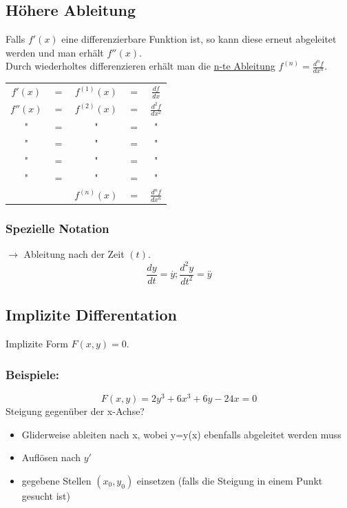 \documentclass[11pt]{amsart}
\theoremstyle{remark}
\begin{document}
\subsection{H\"ohere Ableitung}
Falls $f'(x)$ eine differenzierbare Funktion ist, so kann diese erneut abgeleitet werden und man erh\"alt $f''(x)$.\\
Durch wiederholtes differenzieren erh\"alt man die \underline{n-te Ableitung} $f^{(n)} = \frac {d^nf}{dx^n}$.
\begin{table}[h]
\begin{center}
\begin{tabular}[h]{ccccc}
$f'(x)$&$=$&$f^{(1)}(x)$&$=$&$\frac {df}{dx}$\\
$f''(x)$&$=$&$f^{(2)}(x)$&$=$&$\frac {d^2f}{dx^2}$\\
"&$=$&"&$=$&"\\
"&$=$&"&$=$&"\\
"&$=$&"&$=$&"\\
"&$=$&"&$=$&"\\
&&$f^{(n)}(x)$&$=$&$\frac {d^nf}{dx^n}$\\
\end{tabular}
\end{center}
\label{default}
\end{table}
\subsubsection*{Spezielle Notation}
$\rightarrow$ Ableitung nach der Zeit $(t)$.
\begin{equation*}
\frac {dy}{dt} = \overset {.}{y}; \frac {d^2y}{dt^2} = \overset {..}{y}
\end{equation*}

\subsection{Implizite Differentation}
Implizite Form $F(x,y)=0$.
\subsubsection*{Beispiele:}
\begin{equation*}
F(x,y)=2y^3+6x^3 +6y-24x=0
\end{equation*}
Steigung gegen\"uber der x-Achse?
\begin{itemize}
\item Gliderweise ableiten nach x, wobei y=y(x) ebenfalls abgeleitet werden muss
\item Aufl\"osen nach $y'$
\item gegebene Stellen $(x_0,y_0)$ einsetzen (falls die Steigung in einem Punkt gesucht ist)
\end{itemize}
\end{document}
